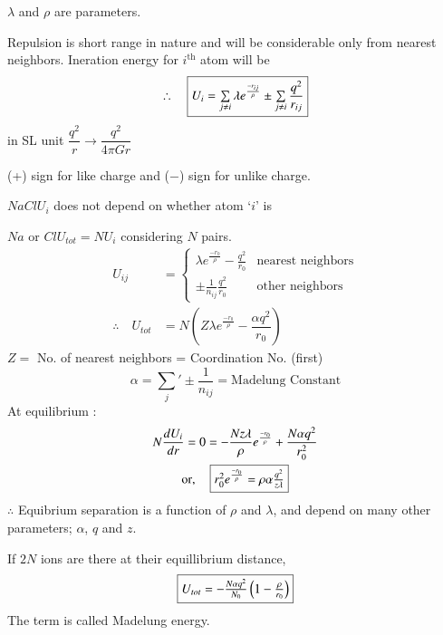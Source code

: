 $\lambda$ and $\rho$ are parameters.

Repulsion is short range in nature and will be considerable only from nearest neighbors. Ineration energy for $i^{\text{th}}$ atom will be
$$
\therefore\quad \fbox{$U_{i}=\sum\limits_{j\neq i}\lambda e^{\frac{-r_{ij}}{\rho}}\pm \sum\limits_{j\neq i}\dfrac{q^{2}}{r_{ij}}$}
$$
in SL unit $\dfrac{q^{2}}{r}\to \dfrac{q^{2}}{4\pi Gr}$

(+) sign for like charge and ($-$) sign for unlike charge.

\begin{example*}
$NaCl$\quad $U_{i}$ does not depend on whether atom `$i$' is

$Na$ or $Cl$\quad $U_{tot}=NU_{i}$ considering $N$ pairs.
\begin{align*}
U_{ij} &=
\left\{
\begin{array}{ll}
\lambda e^{\frac{-r_{0}}\rho}-\frac{q^{2}}{r_{0}} & \text{nearest neighbors}\\
\pm \frac{1}{n_{ij}}\frac{q^{2}}{r_{0}} & \text{other neighbors}
\end{array}
\right.\\
\therefore\quad U_{tot} &= N\left(Z\lambda e^{\frac{-r_{0}}{\rho}}-\dfrac{\alpha q^{2}}{r_{0}}\right)
\end{align*}
$Z=$ No. of nearest neighbors = Coordination No. (first)
$$
\alpha={\sum\limits_{j}}'\pm \frac{1}{n_{ij}}=\text{Madelung Constant}
$$
At equilibrium :
\begin{gather*}
N\dfrac{dU_{i}}{dr}=0=-\dfrac{Nz\lambda}{\rho}e^{\frac{-r_{0}}{\rho}}+\dfrac{N\alpha q^{2}}{r_{0}^{2}}\\
\text{or},\quad \fbox{$r^{2}_{0}e^{\frac{-r_{0}}{\rho}}=\rho\alpha \frac{q^{2}}{z\lambda}$}
\end{gather*}
$\therefore$ Equibrium separation is a function of $\rho$ and $\lambda$, and depend on many other parameters; $\alpha$, $q$ and $z$.

If $2N$ ions are there at their equillibrium distance,
$$
\fbox{$U_{tot}=-\frac{N\alpha q^{2}}{N_{0}}\left(1-\frac{\rho}{r_{0}}\right)$}
$$
The term  is called Madelung energy.
\end{example*}

